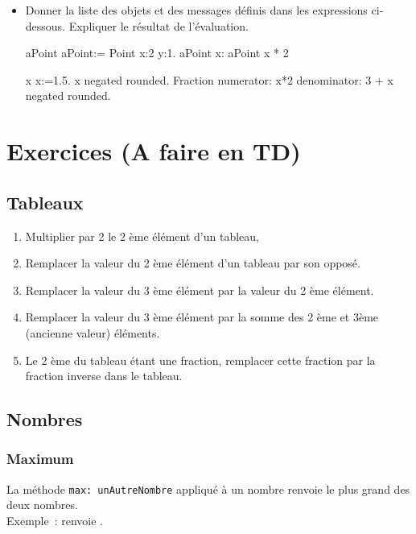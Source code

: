 \begin{itemize}
\item Donner la liste des objets et des messages d\'efinis dans les expressions ci-dessous. Expliquer le r\'esultat de l'\'evaluation.



\begin{scode}
\stBar aPoint \stBar
aPoint:= Point x:2 y:1.
aPoint x: aPoint x * 2

\stBar x \stBar
x:=1.5.
x negated rounded.
Fraction  numerator: x*2 denominator: 3 + x negated rounded.
\end{scode}
\end{itemize}


\section{Exercices (A faire en TD)}
\subsection{Tableaux}

\begin{enumerate}

\item Multiplier  par 2 le 2 \`eme \'el\'ement d'un tableau,
\item Remplacer la valeur du 2 \`eme \'el\'ement d'un tableau par son oppos\'e.
\item  Remplacer la valeur du 3 \`eme  \'el\'ement par la valeur du 2 \`eme
\'el\'ement.
\item  Remplacer la valeur du 3 \`eme  \'el\'ement par la somme des 2 \`eme
et 3\`eme (ancienne valeur) \'el\'ements.
\item Le 2 \`eme du tableau \'etant une fraction, remplacer cette fraction par la fraction inverse dans le tableau.
\end{enumerate}

\subsection{Nombres}

\subsubsection{Maximum}

La m\'ethode \verb|max: unAutreNombre| appliqu\'e \`a un nombre
renvoie le plus grand des deux nombres.\\
Exemple~:  renvoie .

